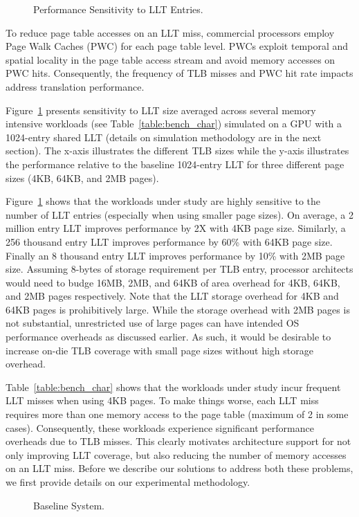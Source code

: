 \begin{figure}[t] 
\vspace{0. in}
\centering
\centerline{}

	\caption{\small Performance Sensitivity to LLT Entries. \normalsize}

\label{fig:tlb_sensitivity} 
\vspace{-0.15 in}
\end{figure}

To reduce page table accesses on an LLT miss, commercial processors
employ Page Walk Caches (PWC) for each page table level. PWCs exploit
temporal and spatial locality in the page table access stream and
avoid memory accesses on PWC hits. Consequently, the frequency of TLB
misses and PWC hit rate impacts address translation performance.

Figure~\ref{fig:tlb_sensitivity} presents sensitivity to LLT size
averaged across several memory intensive workloads (see
Table~\ref{table:bench_char}) simulated on a GPU with a 1024-entry
shared LLT (details on simulation methodology are in the next
section). The x-axis illustrates the different TLB sizes while the
y-axis illustrates the performance relative to the baseline 1024-entry
LLT for three different page sizes (4KB, 64KB, and 2MB pages).



Figure~\ref{fig:tlb_sensitivity} shows that the workloads under study
are highly sensitive to the number of LLT entries (especially when
using smaller page sizes). On average, a 2 million entry LLT improves
performance by 2X with 4KB page size. Similarly, a 256 thousand entry
LLT improves performance by 60\% with 64KB page size. Finally an 8
thousand entry LLT improves performance by 10\% with 2MB page size.
Assuming 8-bytes of storage requirement per TLB entry, processor
architects would need to budge 16MB, 2MB, and 64KB of area overhead
for 4KB, 64KB, and 2MB pages respectively. Note that the LLT storage
overhead for 4KB and 64KB pages is prohibitively large. While the
storage overhead with 2MB pages is not substantial, unrestricted use
of large pages can have intended OS performance overheads as discussed
earlier. As such, it would be desirable to increase on-die TLB
coverage with small page sizes without high storage overhead.

Table~\ref{table:bench_char} shows that the workloads under study
incur frequent LLT misses when using 4KB pages. To make things worse,
each LLT miss requires more than one memory access to the page table
(maximum of 2 in some cases). Consequently, these workloads experience
significant performance overheads due to TLB misses. This clearly
motivates architecture support for not only improving LLT coverage,
but also reducing the number of memory accesses on an LLT miss. Before
we describe our solutions to address both these problems, we first
provide details on our experimental methodology.

\begin{figure}[t]
\vspace{0. in}
\centering
\centerline{}

        \caption{\small Baseline System. \normalsize}

\label{fig:config}
\vspace{-0.15 in}
\end{figure}

